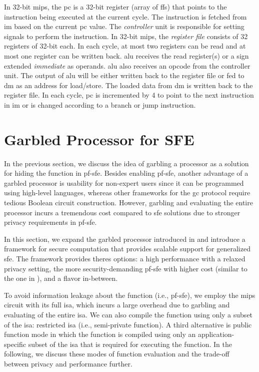 In 32-bit \gls{mips}, the \acrfull{pc} is a 32-bit register (array of \acrshort{ff}s) that points to the instruction being executed at the current cycle.
The instruction is fetched from \acrshort{im} based on the current \acrshort{pc} value.
The \emph{controller} unit is responsible for setting signals to perform the instruction.
In 32-bit \gls{mips}, the \emph{register file} consists of 32 registers of 32-bit each.
In each cycle, at most two registers can be read and at most one register can be written back.
\acrshort{alu} receives the read register(s) or a sign extended \emph{immediate} as operands.
\acrshort{alu} also receives an opcode from the controller unit.
The output of \acrshort{alu} will be either written back to the register file or fed to \acrshort{dm} as an address for load/store.
The loaded data from \acrshort{dm} is written back to the register file.
In each cycle, \acrshort{pc} is incremented by 4 to point to the next instruction in \acrshort{im} or is changed according to a branch or jump instruction.

\section{Garbled Processor for SFE}\label{sec:processor-mips-sfe}
In the previous section, we discuss the idea of garbling a processor as a solution for hiding the function in \acrshort{pf-sfe}.
Besides enabling \acrshort{pf-sfe}, another advantage of a garbled processor is usability for non-expert users since it can be programmed using high-level languages, whereas other frameworks for the \acrshort{gc} protocol require tedious Boolean circuit construction.
However, garbling and evaluating the entire processor incurs a tremendous cost compared to \acrshort{sfe} solutions due to stronger privacy requirements in \acrshort{pf-sfe}.

In this section, we expand the garbled processor introduced in  and introduce a framework for secure computation that provides scalable support for generalized \acrshort{sfe}.
The framework provides theres options: a high performance with a relaxed privacy setting, the more security-demanding \acrshort{pf-sfe} with higher cost (similar to the one in ), and a flavor in-between.

To avoid information leakage about the function (i.e., \acrshort{pf-sfe}), we employ the \gls{mips} circuit with its full \acrfull{isa}, which incurs a large overhead due to garbling and evaluating of the entire \acrshort{isa}.
We can also compile the function using only a subset of the \acrshort{isa}: restricted \acrshort{isa} (i.e., semi-private function).
A third alternative is public function mode in which the function is compiled using only an application-specific subset of the \acrshort{isa} that is required for executing the function.
In the following, we discuss these modes of function evaluation and the trade-off between privacy and performance further.

